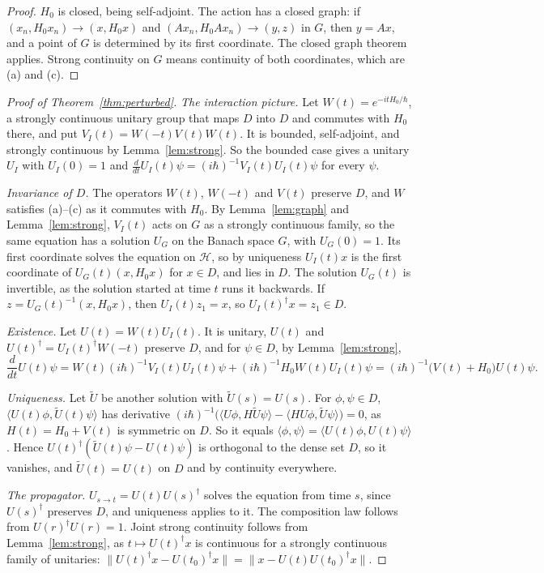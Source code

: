 \documentclass[11pt]{article}
\theoremstyle{definition}
\theoremstyle{remark}
\begin{document}
\begin{proof}
  $H_0$ is closed, being self-adjoint. The action has a closed graph: if $(x_n, H_0x_n)\to(x,
  H_0x)$ and $(Ax_n, H_0Ax_n)\to(y, z)$ in $G$, then $y = Ax$, and a point of $G$ is determined
  by its first coordinate. The closed graph theorem applies. Strong continuity on $G$ means
  continuity of both coordinates, which are (a) and (c).
\end{proof}

\begin{proof}[Proof of Theorem~\ref{thm:perturbed}]
  \emph{The interaction picture.} Let $W(t) = e^{-itH_0/\hbar}$, a strongly continuous unitary
  group that maps $D$ into $D$ and commutes with $H_0$ there, and put $V_I(t) =
  W(-t)V(t)W(t)$. It is bounded, self-adjoint, and strongly continuous by
  Lemma~\ref{lem:strong}. So the bounded case gives a unitary $U_I$ with $U_I(0) = 1$ and
  $\frac{d}{dt}U_I(t)\psi = (i\hbar)^{-1}V_I(t)U_I(t)\psi$ for every $\psi$.

  \emph{Invariance of $D$.} The operators $W(t)$, $W(-t)$ and $V(t)$ preserve $D$, and $W$
  satisfies (a)--(c) as it commutes with $H_0$. By Lemma~\ref{lem:graph} and
  Lemma~\ref{lem:strong}, $V_I(t)$ acts on $G$ as a strongly continuous family, so the same
  equation has a solution $U_G$ on the Banach space $G$, with $U_G(0) = 1$. Its first coordinate
  solves the equation on $\mathcal H$, so by uniqueness $U_I(t)x$ is the first coordinate of
  $U_G(t)(x, H_0x)$ for $x\in D$, and lies in $D$. The solution $U_G(t)$ is invertible, as the
  solution started at time $t$ runs it backwards. If $z = U_G(t)^{-1}(x, H_0x)$, then
  $U_I(t)z_1 = x$, so $U_I(t)^\dagger x = z_1 \in D$.

  \emph{Existence.} Let $U(t) = W(t)U_I(t)$. It is unitary, $U(t)$ and $U(t)^\dagger =
  U_I(t)^\dagger W(-t)$ preserve $D$, and for $\psi\in D$, by Lemma~\ref{lem:strong},
  \[
    \frac{d}{dt}U(t)\psi = W(t)(i\hbar)^{-1}V_I(t)U_I(t)\psi + (i\hbar)^{-1}H_0W(t)U_I(t)\psi =
    (i\hbar)^{-1}\bigl(V(t) + H_0\bigr)U(t)\psi.
  \]

  \emph{Uniqueness.} Let $\tilde U$ be another solution with $\tilde U(s) = U(s)$. For
  $\phi, \psi\in D$, $\langle U(t)\phi, \tilde U(t)\psi\rangle$ has derivative
  $(i\hbar)^{-1}\bigl(\langle U\phi, H\tilde U\psi\rangle - \langle HU\phi, \tilde
  U\psi\rangle\bigr) = 0$, as $H(t) = H_0 + V(t)$ is symmetric on $D$. So it equals $\langle
  \phi, \psi\rangle = \langle U(t)\phi, U(t)\psi\rangle$. Hence $U(t)^\dagger(\tilde U(t)\psi -
  U(t)\psi)$ is orthogonal to the dense set $D$, so it vanishes, and $\tilde U(t) = U(t)$ on $D$
  and by continuity everywhere.

  \emph{The propagator.} $U_{s\to t} = U(t)U(s)^\dagger$ solves the equation from time $s$,
  since $U(s)^\dagger$ preserves $D$, and uniqueness applies to it. The composition law follows
  from $U(r)^\dagger U(r) = 1$. Joint strong continuity follows from Lemma~\ref{lem:strong}, as
  $t\mapsto U(t)^\dagger x$ is continuous for a strongly continuous family of unitaries:
  $\|U(t)^\dagger x - U(t_0)^\dagger x\| = \|x - U(t)U(t_0)^\dagger x\|$.
\end{proof}
\end{document}
